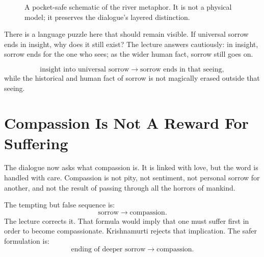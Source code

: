 \documentclass[11pt,oneside]{book}
\begin{document}
\begin{figure}
\centering
{}
\caption{A pocket-safe schematic of the river metaphor. It is not a physical model; it preserves the dialogue's layered distinction.}
\end{figure}

There is a language puzzle here that should remain visible. If universal sorrow ends in insight, why does it still exist? The lecture answers cautiously: in insight, sorrow ends for the one who sees; as the wider human fact, sorrow still goes on.

\begin{equation}
\text{insight into universal sorrow}
\longrightarrow
\text{sorrow ends in that seeing},
\end{equation}
while the historical and human fact of sorrow is not magically erased outside that seeing.

\section{Compassion Is Not A Reward For Suffering}

The dialogue now asks what compassion is. It is linked with love, but the word is handled with care. Compassion is not pity, not sentiment, not personal sorrow for another, and not the result of passing through all the horrors of mankind.

The tempting but false sequence is:
\begin{equation}
\text{sorrow}
\longrightarrow
\text{compassion}.
\end{equation}
The lecture corrects it. That formula would imply that one must suffer first in order to become compassionate. Krishnamurti rejects that implication. The safer formulation is:
\begin{equation}
\text{ending of deeper sorrow}
\longrightarrow
\text{compassion}.
\end{equation}
\end{document}
